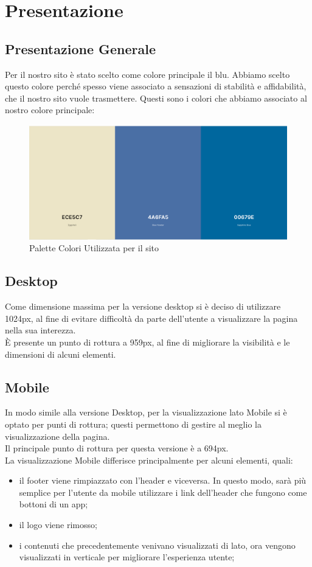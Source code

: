 \section{Presentazione}

  \subsection{Presentazione Generale}
    Per il nostro sito è stato scelto come colore principale il blu. Abbiamo scelto questo colore perché spesso viene associato a sensazioni di stabilità e affidabilità, che il nostro sito vuole trasmettere. 
    Questi sono i colori che abbiamo associato al nostro colore principale:
    \begin{figure}[h]
      \includegraphics[scale=0.4]{Images/ColoriPaginaWeb.png}
      \caption{Palette Colori Utilizzata per il sito}
      \centering
    \end{figure}

  \subsection{Desktop}
    Come dimensione massima per la versione desktop si è deciso di utilizzare 1024px, al fine di evitare difficoltà da parte dell'utente a visualizzare la pagina nella sua interezza. \\
    È presente un punto di rottura a 959px, al fine di migliorare la visibilità e le dimensioni di alcuni elementi.

  \subsection{Mobile}
    In modo simile alla versione Desktop, per la visualizzazione lato Mobile si è optato per punti di rottura; questi permettono di gestire al meglio la visualizzazione della pagina. \\
    Il principale punto di rottura per questa versione è a 694px. \\
    La visualizzazione Mobile differisce principalmente per alcuni elementi, quali:
    \begin{itemize}
      \item il footer viene rimpiazzato con l'header e viceversa. In questo modo, sarà più semplice per l'utente da mobile utilizzare i link dell'header che fungono come bottoni di un app;
      \item il logo viene rimosso;
      \item i contenuti che precedentemente venivano visualizzati di lato, ora vengono visualizzati in verticale per migliorare l'esperienza utente;
    \end{itemize}

